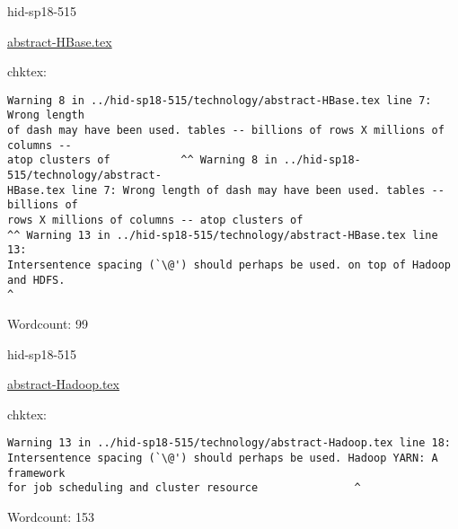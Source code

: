 

\begin{IU}

hid-sp18-515

\href{https://github.com/cloudmesh-community/hid-sp18-515/blob/master//technology/abstract-HBase.tex}{abstract-HBase.tex}

 
chktex:
\begin{tiny}
\begin{verbatim}
Warning 8 in ../hid-sp18-515/technology/abstract-HBase.tex line 7: Wrong length
of dash may have been used. tables -- billions of rows X millions of columns --
atop clusters of           ^^ Warning 8 in ../hid-sp18-515/technology/abstract-
HBase.tex line 7: Wrong length of dash may have been used. tables -- billions of
rows X millions of columns -- atop clusters of
^^ Warning 13 in ../hid-sp18-515/technology/abstract-HBase.tex line 13:
Intersentence spacing (`\@') should perhaps be used. on top of Hadoop and HDFS.
^
\end{verbatim}
\end{tiny}

Wordcount: 99

\end{IU}



\begin{IU}

hid-sp18-515

\href{https://github.com/cloudmesh-community/hid-sp18-515/blob/master//technology/abstract-Hadoop.tex}{abstract-Hadoop.tex}

 
chktex:
\begin{tiny}
\begin{verbatim}
Warning 13 in ../hid-sp18-515/technology/abstract-Hadoop.tex line 18:
Intersentence spacing (`\@') should perhaps be used. Hadoop YARN: A framework
for job scheduling and cluster resource               ^
\end{verbatim}
\end{tiny}

Wordcount: 153

\end{IU}



